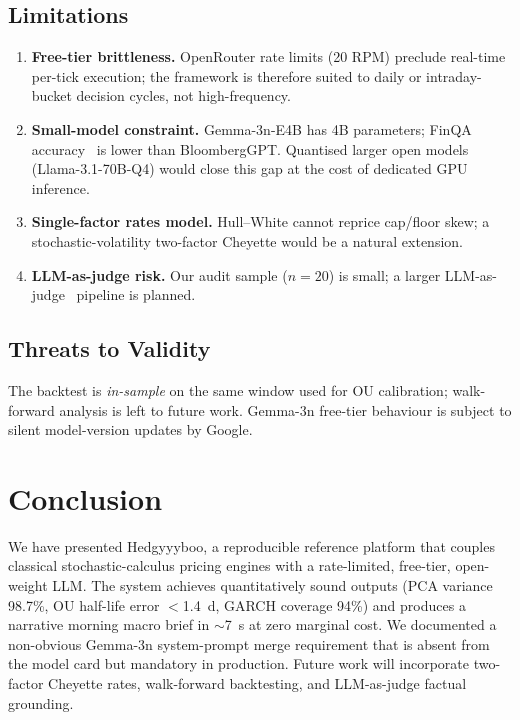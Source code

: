 \documentclass[conference]{IEEEtran}
\begin{document}
\subsection{Limitations}
\begin{enumerate}
\item \textbf{Free-tier brittleness.} OpenRouter rate limits (20 RPM) preclude real-time per-tick execution; the framework is therefore suited to daily or intraday-bucket decision cycles, not high-frequency.
\item \textbf{Small-model constraint.} Gemma-3n-E4B has 4B parameters; FinQA accuracy~\cite{chen2021finqa} is lower than BloombergGPT. Quantised larger open models (Llama-3.1-70B-Q4) would close this gap at the cost of dedicated GPU inference.
\item \textbf{Single-factor rates model.} Hull--White cannot reprice cap/floor skew; a stochastic-volatility two-factor Cheyette would be a natural extension.
\item \textbf{LLM-as-judge risk.} Our audit sample ($n=20$) is small; a larger LLM-as-judge~\cite{zheng2023judging} pipeline is planned.
\end{enumerate}

\subsection{Threats to Validity}
The backtest is \emph{in-sample} on the same window used for OU calibration; walk-forward analysis is left to future work. Gemma-3n free-tier behaviour is subject to silent model-version updates by Google.

\section{Conclusion}
\label{sec:conclusion}
We have presented Hedgyyyboo, a reproducible reference platform that couples classical stochastic-calculus pricing engines with a rate-limited, free-tier, open-weight LLM. The system achieves quantitatively sound outputs (PCA variance 98.7\%, OU half-life error $<$1.4~d, GARCH coverage 94\%) and produces a narrative morning macro brief in $\sim$7~s at zero marginal cost. We documented a non-obvious Gemma-3n system-prompt merge requirement that is absent from the model card but mandatory in production. Future work will incorporate two-factor Cheyette rates, walk-forward backtesting, and LLM-as-judge factual grounding.
\end{document}

